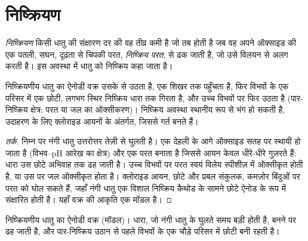 \section{निष्क्रियण}

\begin{definition}[निष्क्रियण]\label{def:b2:corrosion:passivation}
\emph{निष्क्रियण} किसी धातु की संक्षारण दर की वह तीव्र
कमी है जो तब होती है जब वह अपने ऑक्साइड की एक पतली, सघन, दृढ़ता से चिपकी परत,
\emph{निष्क्रिय परत}, से ढक जाती है, जो उसे
विलयन से अलग करती है। इस अवस्था में धातु को निष्क्रिय कहा जाता है।
\end{definition}

\begin{proposition}[निष्क्रिय पठार]\label{prop:b2:corrosion:passivity}
निष्क्रियणीय धातु का ऐनोडी वक्र उसके  से उठता है,
एक शिखर तक पहुँचता है, फिर विभवों के एक परिसर में एक छोटी, लगभग स्थिर निष्क्रिय धारा तक
गिरता है, और उच्च विभवों पर फिर उठता है (पार-निष्क्रिय
क्षेत्र: परत या जल का ऑक्सीकरण)। निष्क्रिय अवस्था स्थानीय रूप से भंग हो सकती है,
उदाहरण के लिए क्लोराइड आयनों के अंतर्गत, जिससे गर्त बनते हैं।
\end{proposition}

\begin{proof}[तर्क]
निम्न  पर नंगी धातु उत्तरोत्तर तेज़ी से घुलती है। एक
देहली के आगे ऑक्साइड सतह पर स्थायी हो जाता है (विभव--pH आरेख का 
क्षेत्र) और एक परत बनाता है जिससे आयन केवल धीरे-धीरे गुज़रते हैं: धारा
उस छोटे अभिवाह तक ढह जाती है। उच्च विभवों पर परत स्वयं विलेय स्पीशीज़ में
ऑक्सीकृत होती है, या उस पर जल ऑक्सीकृत होता है। क्लोराइड आयन, छोटे
और प्रबल संकुलक, कमज़ोर बिंदुओं पर परत को घोल सकते हैं, जहाँ नंगी
धातु एक विशाल निष्क्रिय कैथोड के सामने छोटे ऐनोड के रूप में संक्षारित होती है। यहाँ
वक्र की आकृति एक मॉडल है।
\end{proof}

\begin{omfigure}

{\small निष्क्रियणीय धातु का ऐनोडी वक्र (मॉडल)। धारा, जो नंगी धातु के घुलते समय
बड़ी होती है,  बनने पर ढह जाती है, और पार-निष्क्रिय उठान से पहले
विभवों के एक चौड़े परिसर में छोटी बनी रहती है।}
\end{omfigure}

